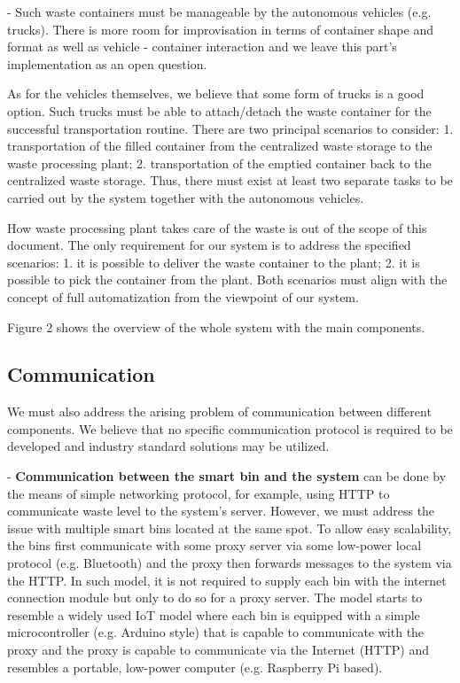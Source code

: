 \documentclass{article}
\begin{document}
- Such waste containers must be manageable by the autonomous vehicles (e.g. trucks). There is more
room for improvisation in terms of container shape and format as well as vehicle - container
interaction and we leave this part's implementation as an open question.

As for the vehicles themselves, we believe that some form of trucks is a good option. Such trucks
must be able to attach/detach the waste container for the successful transportation routine. There
are two principal scenarios to consider: 1. transportation of the filled container from the
centralized waste storage to the waste processing plant; 2. transportation of the emptied container
back to the centralized waste storage. Thus, there must exist at least two separate tasks to be
carried out by the system together with the autonomous vehicles.

How waste processing plant takes care of the waste is out of the scope of this document. The only
requirement for our system is to address the specified scenarios: 1. it is possible to deliver the
waste container to the plant; 2. it is possible to pick the container from the plant. Both scenarios
must align with the concept of full automatization from the viewpoint of our system.

Figure 2 shows the overview of the whole system with the main components.

\subsection{Communication}

We must also address the arising problem of communication between different components. We believe
that no specific communication protocol is required to be developed and industry standard solutions
may be utilized.

- \textbf{Communication between the smart bin and the system} can be done by the means of simple
networking protocol, for example, using HTTP to communicate waste level to the system's server.
However, we must address the issue with multiple smart bins located at the same spot. To allow easy
scalability, the bins first communicate with some proxy server via some low-power local protocol
(e.g. Bluetooth) and the proxy then forwards messages to the system via the HTTP. In such model, it
is not required to supply each bin with the internet connection module but only to do so for a proxy
server. The model starts to resemble a widely used IoT model where each bin is equipped with a
simple microcontroller (e.g. Arduino style) that is capable to communicate with the proxy and the
proxy is capable to communicate via the Internet (HTTP) and resembles a portable, low-power computer
(e.g. Raspberry Pi based).
\end{document}
